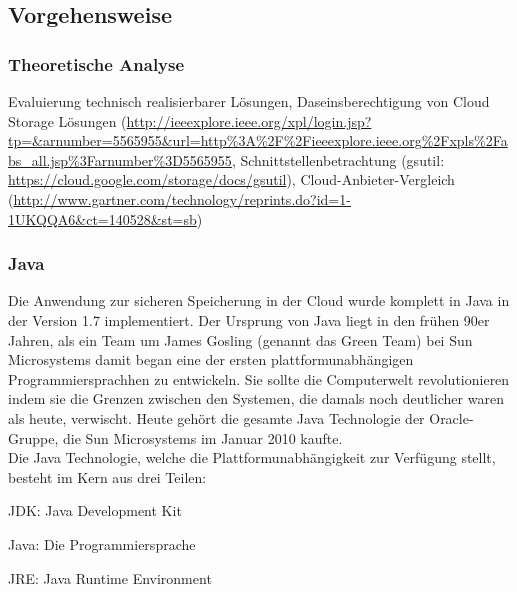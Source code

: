 \documentclass[12pt,a4paper,bibliography=totocnumbered,listof=totocnumbered]{scrartcl}
\begin{document}
\subsection{Vorgehensweise}

\subsubsection{Theoretische Analyse}
Evaluierung technisch realisierbarer Lösungen, Daseinsberechtigung von Cloud Storage Lösungen (\url{http://ieeexplore.ieee.org/xpl/login.jsp?tp=&arnumber=5565955&url=http%3A%2F%2Fieeexplore.ieee.org%2Fxpls%2Fabs_all.jsp%3Farnumber%3D5565955}, Schnittstellenbetrachtung (gsutil:  \url{https://cloud.google.com/storage/docs/gsutil}), Cloud-Anbieter-Vergleich (\url{http://www.gartner.com/technology/reprints.do?id=1-1UKQQA6&ct=140528&st=sb})

\subsubsection{Java}
Die Anwendung zur sicheren Speicherung in der Cloud wurde komplett in Java in der Version 1.7 implementiert. Der Ursprung von Java liegt in den frühen 90er Jahren, als ein Team um James Gosling (genannt das Green Team) bei Sun Microsystems damit began eine der ersten plattformunabhängigen Programmiersprachhen zu entwickeln. Sie sollte die Computerwelt revolutionieren indem sie die Grenzen zwischen den Systemen, die damals noch deutlicher waren als heute, verwischt. Heute gehört die gesamte Java Technologie der Oracle-Gruppe, die Sun Microsystems im Januar 2010 kaufte.\\
Die Java Technologie, welche die Plattformunabhängigkeit zur Verfügung stellt, besteht im Kern aus drei Teilen:
\begin{compactitem}
	\item JDK: Java Development Kit
	\item Java: Die Programmiersprache
	\item JRE: Java Runtime Environment
\end{compactitem}
\end{document}
